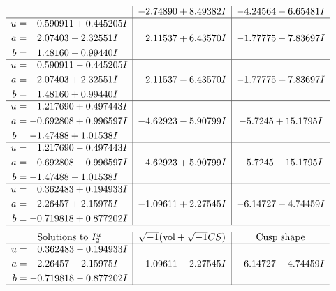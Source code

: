 \documentclass[1p]{elsarticle_modified}
\theoremstyle{definition}
\newcommand{\I}{\sqrt{-1}}
\begin{document}
$$\begin{array}{c|c|c}
 & -2.74890 + 8.49382 I & -4.24564 - 6.65481 I \\ \hline\begin{aligned}
u &= \phantom{-}0.590911 + 0.445205 I \\
a &= \phantom{-}2.07403 - 2.32551 I \\
b &= \phantom{-}1.48160 - 0.99440 I\end{aligned}
 & \phantom{-}2.11537 + 6.43570 I & -1.77775 - 7.83697 I \\ \hline\begin{aligned}
u &= \phantom{-}0.590911 - 0.445205 I \\
a &= \phantom{-}2.07403 + 2.32551 I \\
b &= \phantom{-}1.48160 + 0.99440 I\end{aligned}
 & \phantom{-}2.11537 - 6.43570 I & -1.77775 + 7.83697 I \\ \hline\begin{aligned}
u &= \phantom{-}1.217690 + 0.497443 I \\
a &= -0.692808 + 0.996597 I \\
b &= -1.47488 + 1.01538 I\end{aligned}
 & -4.62923 - 5.90799 I & -5.7245 + 15.1795 I \\ \hline\begin{aligned}
u &= \phantom{-}1.217690 - 0.497443 I \\
a &= -0.692808 - 0.996597 I \\
b &= -1.47488 - 1.01538 I\end{aligned}
 & -4.62923 + 5.90799 I & -5.7245 - 15.1795 I \\ \hline\begin{aligned}
u &= \phantom{-}0.362483 + 0.194933 I \\
a &= -2.26457 + 2.15975 I \\
b &= -0.719818 + 0.877202 I\end{aligned}
 & -1.09611 + 2.27545 I & -6.14727 - 4.74459 I\\
 \hline 
 \end{array}$$\newpage$$\begin{array}{c|c|c}  
\text{Solutions to }I^u_{2}& \I (\text{vol} + \sqrt{-1}CS) & \text{Cusp shape}\\
 \hline 
\begin{aligned}
u &= \phantom{-}0.362483 - 0.194933 I \\
a &= -2.26457 - 2.15975 I \\
b &= -0.719818 - 0.877202 I\end{aligned}
 & -1.09611 - 2.27545 I & -6.14727 + 4.74459 I\\
 \hline 
 \end{array}$$\newpage
\end{document}
